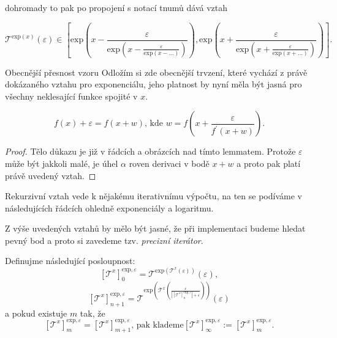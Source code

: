dohromady to pak po propojení s notací tnumů dává vztah

\begin{equation}\label{rekpresexp3}
\mathcal{T}^{\mathrm{exp}(x)}(\varepsilon)\in\left[
\mathrm{exp}\left(x-\frac{\varepsilon}{\mathrm{exp}\left(x-\frac{\varepsilon}{\mathrm{exp}(x-\ldots)}\right)}\right), \mathrm{exp}\left(x+\frac{\varepsilon}{\mathrm{exp}\left(x+\frac{\varepsilon}{\mathrm{exp}(x+\ldots)}\right)}\right)\right].
\end{equation}

\begin{myremark}{Obecnější přesnost vzoru}
Odložím si zde obecnější trvzení, které vychází z právě dokázaného vztahu pro exponenciálu, jeho platnost by nyní měla být jasná pro všechny neklesající funkce spojité v $x$.
\begin{lemma}\label{lem:presprom}
\begin{equation}\label{eq:presprom}
f(x)+\varepsilon=f(x+w)\text{,~kde~}w=f\left(x+\frac{\varepsilon}{f^{'}(x+w)}\right).
\end{equation}
\begin{proof}
Tělo důkazu je již v řádcích a obrázcích nad tímto lemmatem. Protože $\varepsilon$ může být jakkoli malé, je úhel $\alpha$ roven derivaci v bodě $x+w$ a proto pak platí právě uvedený vztah.
\end{proof}
\end{lemma}
Rekurzivní vztah vede k nějakému iterativnímu výpočtu, na ten se podíváme v následujících řádcích ohledně exponenciály a logaritmu.
\end{myremark}

Z výše uvedených vztahů by mělo být jasné, že při implementaci budeme hledat pevný bod a proto si zavedeme tzv. \textit{precizní iterátor}.

\begin{definition}
Definujme následující posloupnost:
\begin{equation}
\left[ \mathcal{T}^x\right]_0^{\mathrm{exp},\varepsilon}=\mathcal{T}^{\mathrm{exp}(\mathcal{T}^x(\varepsilon))}(\varepsilon),
\end{equation}
\begin{equation}
\left[ \mathcal{T}^x\right]_{n+1}^{\mathrm{exp},\varepsilon}=\mathcal{T}^{\mathrm{exp}\left(\mathcal{T}^x\left(\frac{\varepsilon}{\left|\left[ \mathcal{T}^x\right]_n^{\mathrm{exp},\varepsilon}\right|+\varepsilon}\right)\right)}(\varepsilon)
\end{equation}
a pokud existuje $m$ tak, že
\begin{equation}
\left[\mathcal{T}^x\right]_m^{\mathrm{exp},\varepsilon} = \left[\mathcal{T}^x\right]_{m+1}^{\mathrm{exp},\varepsilon}\text{, pak klademe}\left[\mathcal{T}^x \right]_\infty^{\mathrm{exp},\varepsilon} := \left[\mathcal{T}^x\right]_m^{\mathrm{exp},\varepsilon}.
\end{equation}
\end{definition}

